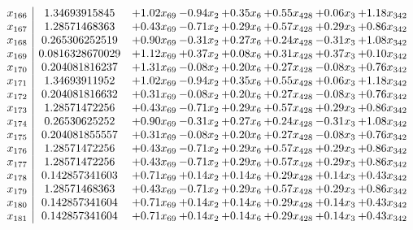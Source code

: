 \documentclass[8pt]{article}
\begin{document}
\[\begin{array}{c| c c@{\hskip 2pt} c@{\hskip 2pt} c@{\hskip 2pt} c@{\hskip 2pt} c@{\hskip 2pt} c@{\hskip 2pt} }
 x_{166}   &  1.34693915845 & +  1.02 x_{69} & -0.94 x_{2} & +  0.35 x_{6} & +  0.55 x_{428} & +  0.06 x_{3} & +  1.18 x_{342}\\
 x_{167}   &  1.28571468363 & +  0.43 x_{69} & -0.71 x_{2} & +  0.29 x_{6} & +  0.57 x_{428} & +  0.29 x_{3} & +  0.86 x_{342}\\
 x_{168}   &  0.265306252519 & +  0.90 x_{69} & -0.31 x_{2} & +  0.27 x_{6} & +  0.24 x_{428} & -0.31 x_{3} & +  1.08 x_{342}\\
 x_{169}   &  0.0816328670029 & +  1.12 x_{69} & +  0.37 x_{2} & +  0.08 x_{6} & +  0.31 x_{428} & +  0.37 x_{3} & +  0.10 x_{342}\\
 x_{170}   &  0.204081816237 & +  1.31 x_{69} & -0.08 x_{2} & +  0.20 x_{6} & +  0.27 x_{428} & -0.08 x_{3} & +  0.76 x_{342}\\
 x_{171}   &  1.34693911952 & +  1.02 x_{69} & -0.94 x_{2} & +  0.35 x_{6} & +  0.55 x_{428} & +  0.06 x_{3} & +  1.18 x_{342}\\
 x_{172}   &  0.204081816632 & +  0.31 x_{69} & -0.08 x_{2} & +  0.20 x_{6} & +  0.27 x_{428} & -0.08 x_{3} & +  0.76 x_{342}\\
 x_{173}   &  1.28571472256 & +  0.43 x_{69} & -0.71 x_{2} & +  0.29 x_{6} & +  0.57 x_{428} & +  0.29 x_{3} & +  0.86 x_{342}\\
 x_{174}   &  0.26530625252 & +  0.90 x_{69} & -0.31 x_{2} & +  0.27 x_{6} & +  0.24 x_{428} & -0.31 x_{3} & +  1.08 x_{342}\\
 x_{175}   &  0.204081855557 & +  0.31 x_{69} & -0.08 x_{2} & +  0.20 x_{6} & +  0.27 x_{428} & -0.08 x_{3} & +  0.76 x_{342}\\
 x_{176}   &  1.28571472256 & +  0.43 x_{69} & -0.71 x_{2} & +  0.29 x_{6} & +  0.57 x_{428} & +  0.29 x_{3} & +  0.86 x_{342}\\
 x_{177}   &  1.28571472256 & +  0.43 x_{69} & -0.71 x_{2} & +  0.29 x_{6} & +  0.57 x_{428} & +  0.29 x_{3} & +  0.86 x_{342}\\
 x_{178}   &  0.142857341603 & +  0.71 x_{69} & +  0.14 x_{2} & +  0.14 x_{6} & +  0.29 x_{428} & +  0.14 x_{3} & +  0.43 x_{342}\\
 x_{179}   &  1.28571468363 & +  0.43 x_{69} & -0.71 x_{2} & +  0.29 x_{6} & +  0.57 x_{428} & +  0.29 x_{3} & +  0.86 x_{342}\\
 x_{180}   &  0.142857341604 & +  0.71 x_{69} & +  0.14 x_{2} & +  0.14 x_{6} & +  0.29 x_{428} & +  0.14 x_{3} & +  0.43 x_{342}\\
 x_{181}   &  0.142857341604 & +  0.71 x_{69} & +  0.14 x_{2} & +  0.14 x_{6} & +  0.29 x_{428} & +  0.14 x_{3} & +  0.43 x_{342}\\

\end{array}\]
\end{document}
